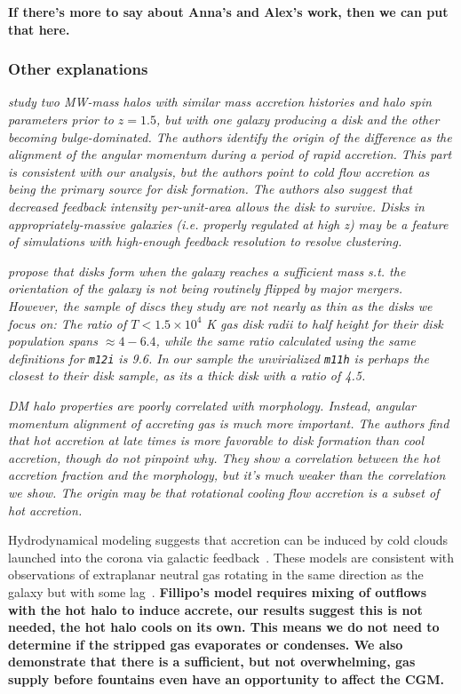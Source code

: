 \documentclass[fleqn,usenatbib]{mnras}
\begin{document}

\textbf{If there's more to say about Anna's and Alex's work, then we can put that here.}

\subsubsection{Other explanations}
\label{s: other disk formation -- sims}

\textit{
\cite{Kretschmer2020} study two MW-mass halos with similar mass accretion histories and halo spin parameters prior to $z=1.5$, but with one galaxy producing a disk and the other becoming bulge-dominated.
The authors identify the origin of the difference as the alignment of the angular momentum during a period of rapid accretion.
This part is consistent with our analysis, but the authors point to \textit{cold flow} accretion as being the primary source for disk formation.
The authors also suggest that decreased feedback intensity per-unit-area allows the disk to survive.
Disks in appropriately-massive galaxies (i.e. properly regulated at high z) may be a feature of simulations with high-enough feedback resolution to resolve clustering.
}

\textit{
\cite{Dekel2020a} propose that disks form when the galaxy reaches a sufficient mass s.t. the orientation of the galaxy is not being routinely flipped by major mergers.
However, the sample of discs they study are not nearly as thin as the disks we focus on:
The ratio of $T < 1.5 \times 10^4$ K gas disk radii to half height for their disk population spans $\approx 4-6.4$, while the same ratio calculated using the same definitions for \texttt{m12i} is 9.6.
In our sample the unvirialized \texttt{m11h} is perhaps the closest to their disk sample, as its a thick disk with a ratio of 4.5.
}

\textit{
DM halo properties are poorly correlated with morphology.
Instead, angular momentum alignment of accreting gas is much more important.
The authors find that hot accretion at late times is more favorable to disk formation than cool accretion, though do not pinpoint why.
They show a correlation between the hot accretion fraction and the morphology, but it's much weaker than the correlation we show.
The origin may be that rotational cooling flow accretion is a subset of hot accretion.
}

Hydrodynamical modeling suggests that accretion can be induced by cold clouds launched into the corona via galactic feedback~\citep[e.g.][]{Marinacci2010, Marinacci2011, Marinacci2012, Armillotta2016a, Fraternali2017, Hobbs2020}.
These models are consistent with observations of extraplanar neutral gas rotating in the same direction as the galaxy but with some lag~\citep[e.g.][]{Fraternali2008,  Marasco2012, Fraternali2014a}.
\textbf{
Fillipo's model requires mixing of outflows with the hot halo to induce accrete, our results suggest this is not needed, the hot halo cools on its own.
This means we do not need to determine if the stripped gas evaporates or condenses.
We also demonstrate that there is a sufficient, but not overwhelming, gas supply before fountains even have an opportunity to affect the CGM.
}
\end{document}
